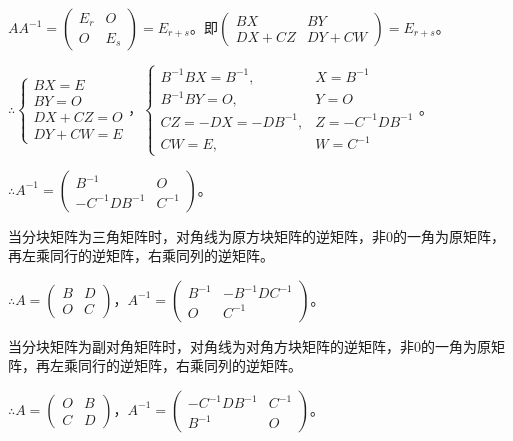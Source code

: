 $AA^{-1}=\left(\begin{array}{cc}
    E_r & O \\
    O & E_s
\end{array}\right)=E_{r+s}$。即$\left(\begin{array}{cc}
    BX & BY \\
    DX+CZ & DY+CW
\end{array}\right)=E_{r+s}$。

$\therefore\left\{\begin{array}{l}
    BX=E \\
    BY=O \\
    DX+CZ=O \\
    DY+CW=E
\end{array}\right.$，$\left\{\begin{array}{ll}
    B^{-1}BX=B^{-1}, & X=B^{-1}\\
    B^{-1}BY=O, & Y=O \\
    CZ=-DX=-DB^{-1}, & Z=-C^{-1}DB^{-1} \\
    CW=E, & W=C^{-1}
\end{array}\right.$。

$\therefore A^{-1}=\left(\begin{array}{cc}
    B^{-1} & O \\
    -C^{-1}DB^{-1} & C^{-1}
\end{array}\right)$。\medskip

当分块矩阵为三角矩阵时，对角线为原方块矩阵的逆矩阵，非0的一角为原矩阵，再左乘同行的逆矩阵，右乘同列的逆矩阵。\medskip

$\therefore A=\left(\begin{array}{cc}
    B & D \\
    O & C
\end{array}\right)$，$A^{-1}=\left(\begin{array}{cc}
    B^{-1} & -B^{-1}DC^{-1} \\
    O & C^{-1}
\end{array}\right)$。\medskip

当分块矩阵为副对角矩阵时，对角线为对角方块矩阵的逆矩阵，非0的一角为原矩阵，再左乘同行的逆矩阵，右乘同列的逆矩阵。\medskip

$\therefore A=\left(\begin{array}{cc}
    O & B \\
    C & D
\end{array}\right)$，$A^{-1}=\left(\begin{array}{cc}
    -C^{-1}DB^{-1} & C^{-1} \\
    B^{-1} & O
\end{array}\right)$。\medskip

